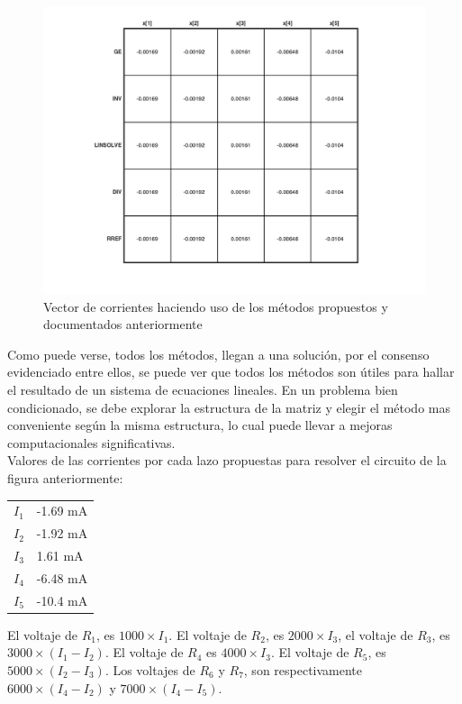 \documentclass[11pt, spanish]{article}
\begin{document}
\begin{enumerate}
\begin{figure}[htbp]
\centering
	\includegraphics[scale=0.7]{data/img/plot_circuit_solution}
	\caption{Vector de corrientes haciendo uso de los métodos propuestos y documentados anteriormente}
\end{figure}

Como puede verse, todos los métodos, llegan a una solución, por el consenso evidenciado entre ellos, se puede ver que todos los métodos son útiles para hallar el resultado de un sistema de ecuaciones lineales. En un problema bien condicionado, se debe explorar la estructura de la matriz y elegir el método mas conveniente según la misma estructura, lo cual puede llevar a mejoras computacionales significativas.\\

Valores de las corrientes por cada lazo propuestas para resolver el circuito de la figura anteriormente:

\begin{center}
\begin{tabular}{ |l|l| }
  \hline
  $I_1$ & -1.69 mA \\
  $I_2$ & -1.92 mA \\
  $I_3$ & 1.61 mA\\
  $I_4$ & -6.48 mA \\
  $I_5$ &  -10.4 mA\\
  \hline
\end{tabular}
\end{center}

El voltaje de $R_1$, es $1000 \times I_1$. El voltaje de $R_2$, es $2000 \times I_3$, el voltaje de $R_3$, es $3000 \times (I_1 - I_2)$. El voltaje de $R_4$ es $4000 \times I_3$. El voltaje de $R_5$, es $5000 \times (I_2 - I_3)$. Los voltajes de $R_6$ y $R_7$, son respectivamente $6000 \times (I_4 - I_2)$ y $7000 \times (I_4 - I_5)$.




\end{enumerate}
\end{document}
